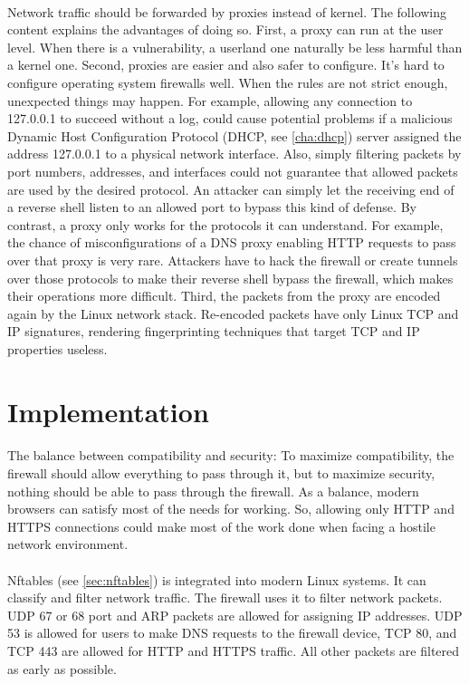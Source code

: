 \documentclass[mscthesis]{usiinfthesis}
\begin{document}
\paragraph{}
Network traffic should be forwarded by proxies instead of kernel. The following content explains the advantages of doing so. First, a proxy can run at the user level. When there is a vulnerability, a userland one naturally be less harmful than a kernel one. Second, proxies are easier and also safer to configure. It's hard to configure operating system firewalls well. When the rules are not strict enough, unexpected things may happen. For example, allowing any connection to 127.0.0.1 to succeed without a log, could cause potential problems if a malicious Dynamic Host Configuration Protocol (DHCP, see \cref{cha:dhcp}) server assigned the address 127.0.0.1 to a physical network interface. Also, simply filtering packets by port numbers, addresses, and interfaces could not guarantee that allowed packets are used by the desired protocol. An attacker can simply let the receiving end of a reverse shell listen to an allowed port to bypass this kind of defense. By contrast, a proxy only works for the protocols it can understand. For example, the chance of misconfigurations of a DNS proxy enabling HTTP requests to pass over that proxy is very rare. Attackers have to hack the firewall or create tunnels over those protocols to make their reverse shell bypass the firewall, which makes their operations more difficult. Third, the packets from the proxy are encoded again by the Linux network stack. Re-encoded packets have only Linux TCP and IP signatures, rendering fingerprinting techniques that target TCP and IP properties useless.

\section{Implementation}
\paragraph{}
The balance between compatibility and security: To maximize compatibility, the firewall should allow everything to pass through it, but to maximize security, nothing should be able to pass through the firewall. As a balance, modern browsers can satisfy most of the needs for working. So, allowing only HTTP and HTTPS connections could make most of the work done when facing a hostile network environment.
\paragraph{}
Nftables (see \cref{sec:nftables}) is integrated into modern Linux systems. It can classify and filter network traffic. The firewall uses it to filter network packets. UDP 67 or 68 port and ARP packets are allowed for assigning IP addresses. UDP 53 is allowed for users to make DNS requests to the firewall device, TCP 80, and TCP 443 are allowed for HTTP and HTTPS traffic. All other packets are filtered as early as possible.
\end{document}
